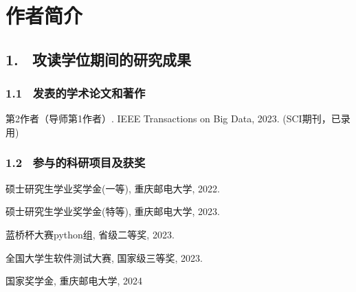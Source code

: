 \specialsectioning


\chapter{作者简介}
\thispagestyle{others}
\pagestyle{others}
\xiaosi

%
%
%
\section{1. \ 攻读学位期间的研究成果}

\vspace{0.2cm}


\subsection{1.1 \ 发表的学术论文和著作}
\begin{enumerate}[label={[{\arabic*}]}, leftmargin=2em]
	\item  第2作者（导师第1作者）. IEEE Transactions on Big Data, 2023. (SCI期刊，已录用)
\end{enumerate}


\subsection{1.2 \ 参与的科研项目及获奖}
\begin{enumerate}[label={[{\arabic*}]}, leftmargin=2em, itemsep=0pt, parsep=0pt, topsep=0pt]
	\item  硕士研究生学业奖学金(一等), 重庆邮电大学, 2022.
	\item  硕士研究生学业奖学金(特等), 重庆邮电大学, 2023.
	\item  蓝桥杯大赛python组, 省级二等奖, 2023.
	\item  全国大学生软件测试大赛, 国家级三等奖, 2023.
	\item  国家奖学金, 重庆邮电大学, 2024
\end{enumerate}






